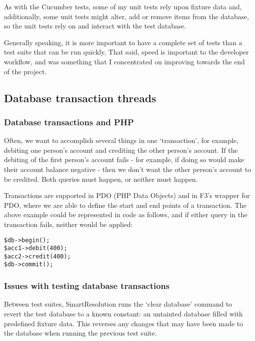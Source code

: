 As with the Cucumber tests, some of my unit tests rely upon fixture data and, additionally, some unit tests might alter, add or remove items from the database, so the unit tests rely on and interact with the test database.

Generally speaking, it is more important to have a complete set of tests than a test suite that can be run quickly. That said, speed is important to the developer workflow, and was something that I concentrated on improving towards the end of the project.

\subsection{Database transaction threads}

\subsubsection{Database transactions and PHP}

Often, we want to accomplish several things in one `transaction', for example, debiting one person's account and crediting the other person's account. If the debiting of the first person's account fails - for example, if doing so would make their account balance negative - then we don't want the other person's account to be credited. Both queries must happen, or neither must happen.

Transactions are supported in PDO (PHP Data Objects) and in F3's wrapper for PDO, where we are able to define the start and end points of a transaction. The above example could be represented in code as follows, and if either query in the transaction fails, neither would be applied:

\begin{lstlisting}
$db->begin();
$acc1->debit(400);
$acc2->credit(400);
$db->commit();
\end{lstlisting}

\subsubsection{Issues with testing database transactions}

Between test suites, SmartResolution runs the `clear database' command to revert the test database to a known constant: an untainted database filled with predefined fixture data. This reverses any changes that may have been made to the database when running the previous test suite.

